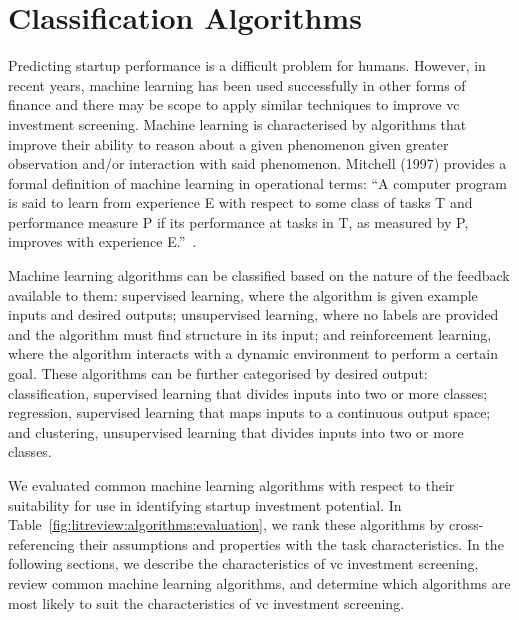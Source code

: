 \documentclass[../thesis/thesis.tex]{subfiles}
\begin{document}
\section{Classification Algorithms}

Predicting startup performance is a difficult problem for humans. However, in recent years, machine learning has been used successfully in other forms of finance and there may be scope to apply similar techniques to improve \gls{vc} investment screening. Machine learning is characterised by algorithms that improve their ability to reason about a given phenomenon given greater observation and/or interaction with said phenomenon. Mitchell (1997) provides a formal definition of machine learning in operational terms: ``A computer program is said to learn from experience E with respect to some class of tasks T and performance measure P if its performance at tasks in T, as measured by P, improves with experience E.''~\cite{mitchell1997}.

Machine learning algorithms can be classified based on the nature of the feedback available to them: supervised learning, where the algorithm is given example inputs and desired outputs; unsupervised learning, where no labels are provided and the algorithm must find structure in its input; and reinforcement learning, where the algorithm interacts with a dynamic environment to perform a certain goal. These algorithms can be further categorised by desired output: classification, supervised learning that divides inputs into two or more classes; regression, supervised learning that maps inputs to a continuous output space; and clustering, unsupervised learning that divides inputs into two or more classes.

We evaluated common machine learning algorithms with respect to their suitability for use in identifying startup investment potential. In Table~\ref{fig:litreview:algorithms:evaluation}, we rank these algorithms by cross-referencing their assumptions and properties with the task characteristics. In the following sections, we describe the characteristics of \gls{vc} investment screening, review common machine learning algorithms, and determine which algorithms are most likely to suit the characteristics of \gls{vc} investment screening.
\end{document}
